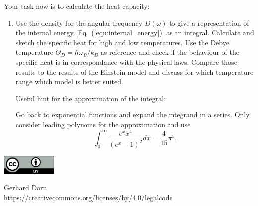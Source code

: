 \documentclass[12pt,a4paper]{article} %
\begin{document}
  

  Your task now is to calculate the heat capacity:
  \begin{enumerate}[resume]
  \item  Use the density for the angular frequency $D(\omega)$ to give a representation of the internal energy [Eq.~(\ref{equ:internal_energy})] as an integral. Calculate and sketch the specific heat for high and low temperatures. Use the Debye temperature $\Theta_D = \hbar \omega_D / k_B$ as reference and check if the behaviour of the specific heat is in correspondance with the physical laws.
  Compare those results to the results of the Einstein model and discuss for which temperature range which model is better suited.
  
  
  Useful hint for the approximation of the integral:
  
  Go back to exponential functions and expand the integrand in a series. Only consider leading polynoms for the approximation and use
  $$ \int_0^\infty \frac{e^x x^4}{(e^x-1)^2} dx = \frac{4}{15} \pi^4. $$
   \end{enumerate}




\vspace{2cm}
\begin{minipage}[t]{1\textwidth}
	\raggedleft
	\centering
	\includegraphics[width = 0.20\textwidth]{CC-BY_icon}
	\vspace{0.2cm}
	
	\centering
	{\Large Gerhard Dorn} \\
	https://creativecommons.org/licenses/by/4.0/legalcode
\end{minipage}



  
\end{document}
